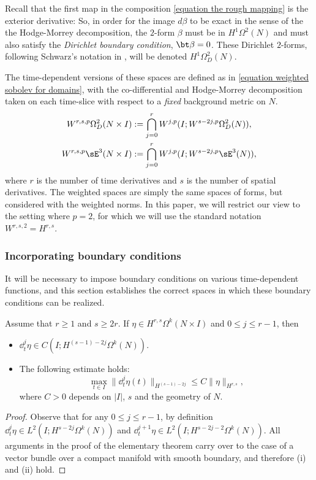 \documentclass[hidelinks, 12pt, oneside, reqno]{amsart}
\begin{document}
Recall that the first map in the composition \eqref{equation the rough mapping} is the exterior derivative: So, in order for the image $d\beta$ to be exact in the sense of the the Hodge-Morrey decomposition, the $2$-form $\beta$ must be in $H^1\Omega^{2}(N)$ and must also satisfy the \textit{Dirichlet boundary condition}, $\bt \beta = 0$. These Dirichlet $2$-forms, following Schwarz's notation in \cite[\S 2.2]{HodgeDecompSchwarz}, will be denoted $H^1\Omega^2_D(N)$.


The time-dependent versions of these spaces are defined as in \eqref{equation weighted sobolev for domains}, with the co-differential and Hodge-Morrey decomposition taken on each time-slice with respect to a \textit{fixed} background metric on $N$.
\begin{align}
    W^{r,s,p} \Omega_D^2(N \times I) &:= \bigcap_{j=0}^r W^{j,p}(I; W^{s-2j,p} \Omega_D^2(N)), \label{equation time dependent dirichlet forms}\\
    W^{r,s,p} \sE^3(N \times I) &:= \bigcap_{j=0}^r W^{j,p}(I; W^{s-2j,p} \sE^3(N)), \label{equation time dependent exact forms}
\end{align}
where $r$ is the number of time derivatives and $s$ is the number of spatial derivatives. The weighted spaces are simply the same spaces of forms, but considered with the weighted norms. In this paper, we will restrict our view to the setting where $p=2$, for which we will use the standard notation $W^{r,s,2} = H^{r,s}$. 

\subsubsection{Incorporating boundary conditions}\label{section boundary conditions}

It will be necessary to impose boundary conditions on various time-dependent functions, and this section establishes the correct spaces in which these boundary conditions can be realized. 

\begin{lem}\label{lemma smoothness of time derivatives}
Assume that $r \ge 1$ and $s \ge 2r$. If $\eta \in H^{r,s} \Omega^k (N \times I)$ and $0 \le j \le r-1$, then
\begin{itemize}
    \item[(i)] $\dd_t^j \eta \in C(I; H^{(s-1)-2j}\Omega^k(N))$.
    \item[(ii)] The following estimate holds:
    \[
    \max_{t \in I} \|\dd_t^j \eta (t)\|_{H^{(s-1)-2j}} \le C \|\eta\|_{H^{r,s}},
    \]
    where $C > 0$ depends on $|I|$, $s$ and the geometry of $N$.
\end{itemize}
\end{lem}
\begin{proof}
Observe that for any $0 \le j \le r-1$, by definition $\dd_t^j\eta \in L^2(I; H^{s-2j} \Omega^k(N))$ and $\dd_t^{j+1} \eta \in L^2(I; H^{s-2j-2} \Omega^k(N))$. All arguments in the proof of the elementary theorem \cite[\S 5.9.2, Theorem 4]{EvansPDE} carry over to the case of a vector bundle over a compact manifold with smooth boundary, and therefore (i) and (ii) hold.
\end{proof}
\end{document}
